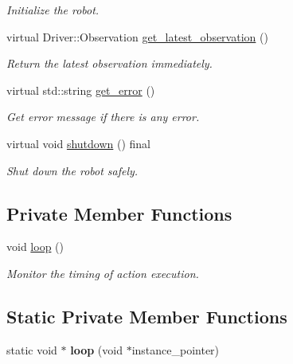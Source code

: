 \begin{DoxyCompactItemize}
\begin{DoxyCompactList}\small\item\em Initialize the robot. \end{DoxyCompactList}\item 
virtual Driver\+::\+Observation \hyperlink{classrobot__interfaces_1_1MonitoredRobotDriver_a97774dddcda1038f338d18ef0b572ad8}{get\+\_\+latest\+\_\+observation} ()
\begin{DoxyCompactList}\small\item\em Return the latest observation immediately. \end{DoxyCompactList}\item 
virtual std\+::string \hyperlink{classrobot__interfaces_1_1MonitoredRobotDriver_a944425cc7e0845184f33b16405a9e61e}{get\+\_\+error} ()
\begin{DoxyCompactList}\small\item\em Get error message if there is any error. \end{DoxyCompactList}\item 
virtual void \hyperlink{classrobot__interfaces_1_1MonitoredRobotDriver_a95714a60e69a3ac06461382a7b391289}{shutdown} () final
\begin{DoxyCompactList}\small\item\em Shut down the robot safely. \end{DoxyCompactList}\end{DoxyCompactItemize}
\subsection*{Private Member Functions}
\begin{DoxyCompactItemize}
\item 
void \hyperlink{classrobot__interfaces_1_1MonitoredRobotDriver_a6ed3d940dce484dcdc558a52a8dfe8a5}{loop} ()
\begin{DoxyCompactList}\small\item\em Monitor the timing of action execution. \end{DoxyCompactList}\end{DoxyCompactItemize}
\subsection*{Static Private Member Functions}
\begin{DoxyCompactItemize}
\item 
\mbox{\label{classrobot__interfaces_1_1MonitoredRobotDriver_a46ddb0472196631d6cdd109f3753c693}} 
static void $\ast$ {\bfseries loop} (void $\ast$instance\+\_\+pointer)
\end{DoxyCompactItemize}
